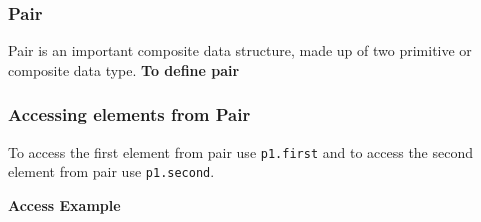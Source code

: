 \begin{frame}
    \frametitle{Pair}

    Pair is an important composite data structure, made up of two primitive or composite data type.
    \textbf{To define pair}

    
    
\end{frame}

\begin{frame}
    \frametitle{Accessing elements from Pair}

    To access the first element from pair use \texttt{p1.first} and to 
    access the second element from pair use \texttt{p1.second}.

    \vspace*{2mm}

    \textbf{Access Example}

    

\end{frame}
